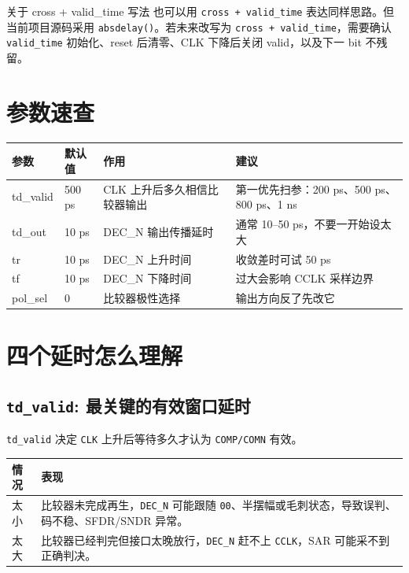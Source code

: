 \documentclass[11pt,a4paper,UTF8]{ctexart}
\begin{document}
\begin{warnbox}{关于 cross + valid\_time 写法}
也可以用 \texttt{cross + valid\_time} 表达同样思路。但当前项目源码采用 \texttt{absdelay()}。若未来改写为 \texttt{cross + valid\_time}，需要确认 \texttt{valid\_time} 初始化、reset 后清零、CLK 下降后关闭 valid，以及下一 bit 不残留。
\end{warnbox}

\section{参数速查}

\begin{center}
\begin{tabularx}{\textwidth}{>{\ttfamily}l l X X}
\toprule
\textbf{参数} & \textbf{默认值} & \textbf{作用} & \textbf{建议} \\
\midrule
td\_valid & 500 ps & CLK 上升后多久相信比较器输出 & 第一优先扫参：200 ps、500 ps、800 ps、1 ns \\
td\_out & 10 ps & DEC\_N 输出传播延时 & 通常 10--50 ps，不要一开始设太大 \\
tr & 10 ps & DEC\_N 上升时间 & 收敛差时可试 50 ps \\
tf & 10 ps & DEC\_N 下降时间 & 过大会影响 CCLK 采样边界 \\
pol\_sel & 0 & 比较器极性选择 & 输出方向反了先改它 \\
\bottomrule
\end{tabularx}
\end{center}

\section{四个延时怎么理解}

\subsection{\texttt{td\_valid}: 最关键的有效窗口延时}

\texttt{td\_valid} 决定 \texttt{CLK} 上升后等待多久才认为 \texttt{COMP/COMN} 有效。

\begin{center}
\begin{tabularx}{0.96\textwidth}{lX}
\toprule
\textbf{情况} & \textbf{表现} \\
\midrule
太小 & 比较器未完成再生，\texttt{DEC\_N} 可能跟随 \texttt{00}、半摆幅或毛刺状态，导致误判、码不稳、SFDR/SNDR 异常。 \\
太大 & 比较器已经判完但接口太晚放行，\texttt{DEC\_N} 赶不上 \texttt{CCLK}，SAR 可能采不到正确判决。 \\
\bottomrule
\end{tabularx}
\end{center}
\end{document}
